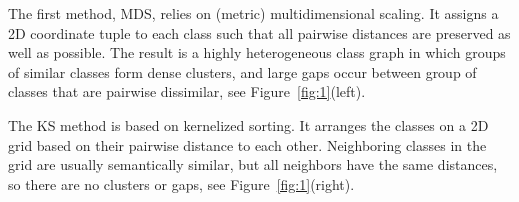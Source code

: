 \documentclass[10pt,twocolumn,letterpaper]{article}
\begin{document}
The first method, MDS, relies on (metric) multidimensional scaling. It assigns a 2D coordinate tuple to each class such that all pairwise distances are preserved as well as possible. The result is a highly heterogeneous class graph in which groups of similar classes form dense clusters, and large gaps occur between group of classes that are pairwise dissimilar, see Figure~\ref{fig:1}(left).

The KS method is based on kernelized sorting\cite{Quadrianto2010Kernelized}. It arranges the classes on a 2D grid based on their pairwise distance to each other. Neighboring classes in the grid are usually semantically similar, but all neighbors have the same distances, so there are no clusters or gaps, see Figure~\ref{fig:1}(right).
{\small


}
\end{document}
